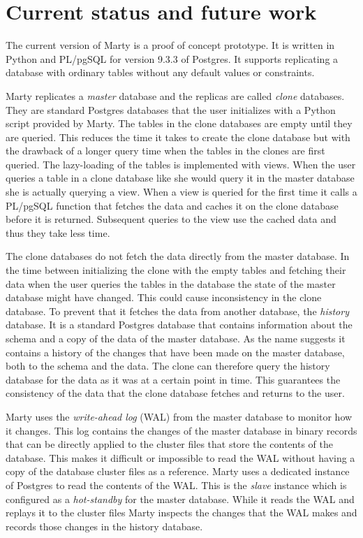 \chapter{Current status and future work}
\label{ch:current-status}
The current version of Marty is a proof of concept prototype.
It is written in Python and PL/pgSQL for version 9.3.3 of Postgres.
It supports replicating a database with ordinary tables without any default values or constraints.

Marty replicates a \textit{master} database and the replicas are called \textit{clone} databases.
They are standard Postgres databases that the user initializes with a Python script provided by Marty.
The tables in the clone databases are empty until they are queried.
This reduces the time it takes to create the clone database but with the drawback of a longer query time when the tables in the clones are first queried.
The lazy-loading of the tables is implemented with views.
When the user queries a table in a clone database like she would query it in the master database she is actually querying a view.
When a view is queried for the first time it calls a PL/pgSQL function that fetches the data and caches it on the clone database before it is returned.
Subsequent queries to the view use the cached data and thus they take less time.

The clone databases do not fetch the data directly from the master database.
In the time between initializing the clone with the empty tables and fetching their data when the user queries the tables in the database the state of the master database might have changed.
This could cause inconsistency in the clone database.
To prevent that it fetches the data from another database, the \textit{history} database.
It is a standard Postgres database that contains information about the schema and a copy of the data of the master database.
As the name suggests it contains a history of the changes that have been made on the master database, both to the schema and the data.
The clone can therefore query the history database for the data as it was at a certain point in time.
This guarantees the consistency of the data that the clone database fetches and returns to the user.

Marty uses the \textit{write-ahead log} (WAL) from the master database to monitor how it changes.
This log contains the changes of the master database in binary records that can be directly applied to the cluster files that store the contents of the database.
This makes it difficult or impossible to read the WAL without having a copy of the database cluster files as a reference.
Marty uses a dedicated instance of Postgres to read the contents of the WAL.
This is the \textit{slave} instance which is configured as a \textit{hot-standby} for the master database.
While it reads the WAL and replays it to the cluster files Marty inspects the changes that the WAL makes and records those changes in the history database.


